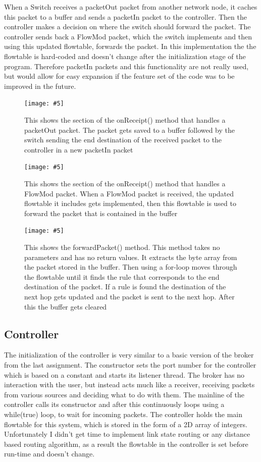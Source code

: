 \documentclass{article}
\newcommand{\includescalefigure}[5]{
\begin{figure}[htb]
\centering
\texttt{[image: \#5]}
\captionsetup{width=.8\linewidth} 
\caption[#2]{#3}
\label{#1}
\end{figure}
}
\begin{document}
When a Switch receives a packetOut packet from another network node, it caches this packet to a buffer and sends a packetIn packet to the controller. Then the controller makes a decision on where the switch should forward the packet. The controller sends back a FlowMod packet, which the switch implements and then using this updated flowtable, forwards the packet. In this implementation the the flowtable is hard-coded and doesn't change after the initialization stage of the program. Therefore packetIn packets and this functionality are not really used, but would allow for easy expansion if the feature set of the code was to be improved in the future.

\includescalefigure{PacketOut}{onReceipt() method showing packetOut}{This shows the section of the onReceipt() method that handles a packetOut packet. The packet gets saved to a buffer followed by the switch sending the end destination of the received packet to the controller in a new packetIn packet }{1.0}{onReceipt-Switch-PacketOut.PNG}

\includescalefigure{FlowMod}{onReceipt() method showing FlowMod}{This shows the section of the onReceipt() method that handles a FlowMod packet. When a FlowMod packet is received, the updated flowtable it includes gets implemented, then this flowtable is used to forward the packet that is contained in the buffer}{0.8}{onReceipt-Switch-FlowMod.PNG}

\includescalefigure{forwardPacket}{forwardPacket method}{This shows the forwardPacket() method. This method takes no parameters and has no return values. It extracts the byte array from the packet stored in the buffer. Then using a for-loop moves through the flowtable until it finds the rule that corresponds to the end destination of the packet. If a rule is found the destination of the next hop gets updated and the packet is sent to the next hop. After this the buffer gets cleared}{0.9}{forwardPacket-method.PNG}

\pagebreak

\subsection{Controller}

The initialization of the controller is very similar to a basic version of the broker from the last assignment. The constructor sets the port number for the controller which is based on a constant and starts its listener thread. 
\newline
\newline
The broker has no interaction with the user, but instead acts much like a receiver, receiving packets from various sources and deciding what to do with them. The mainline of the controller calls its constructor and after this continuously loops using a while(true) loop, to wait for incoming packets. 
\newline
\newline
The controller holds the main flowtable for this system, which is stored in the form of a 2D array of integers. Unfortunately I didn't get time to implement link state routing or any distance based routing algorithm, as a result the flowtable in the controller is set before run-time and doesn't change.
\end{document}
